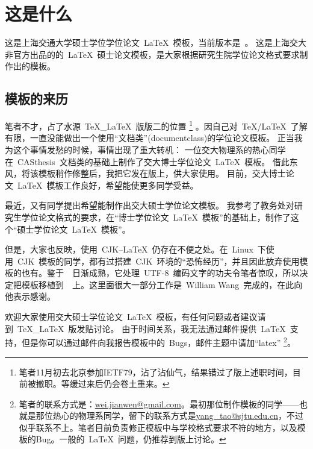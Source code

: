 
\chapter{这是什么}
\label{chap:what}

这是上海交通大学硕士学位学位论文~\LaTeX~模板，当前版本是~\version。
这是上海交大非官方出品的的~\LaTeX~硕士论文模板，是大家根据研究生院学位论文格式要求制作出的模板。

\section{模板的来历}

笔者不才，占了水源~TeX\_LaTeX~版版二的位置
\footnote{笔者11月初去北京参加IETF79，沾了沾仙气，结果错过了版上述职时间，目前被撤职。等缓过来后仍会卷土重来。}
。因自己对~\TeX/\LaTeX~了解有限，一直没能做出一个使用“文档类”(documentclass)的学位论文模板。
正当我为这个事情发愁的时候，事情出现了重大转机：
一位交大物理系的热心同学在~CASthesis~文档类的基础上制作了交大博士学位论文~\LaTeX~模板。
借此东风，将该模板稍作修整后，我把它发在版上，供大家使用。
目前，交大博士论文~\LaTeX~模板工作良好，希望能使更多同学受益。

最近，又有同学提出希望能制作出交大硕士学位论文模板。
我参考了教务处对研究生学位论文格式的要求，在``博士学位论文~\LaTeX~模板''的基础上，制作了这个``硕士学位论文~\LaTeX~模板''。

但是，大家也反映，使用~CJK--\LaTeX~仍存在不便之处。在~Linux~下使用~CJK~模板的同学，都有过搭建~CJK~环境的``恐怖经历''，并且因此放弃使用模板的也有。鉴于~\XeTeX~日渐成熟，它处理~UTF-8~编码文字的功夫令笔者惊叹，所以决定把模板移植到~\XeTeX~上。这里面很大一部分工作是~William Wang~完成的，在此向他表示感谢。

欢迎大家使用交大硕士学位论文~\LaTeX~模板，有任何问题或者建议请到~TeX\_LaTeX~版发贴讨论。
由于时间关系，我无法通过邮件提供~\LaTeX~支持，但是你可以通过邮件向我报告模板中的~Bugs，邮件主题中请加``latex''
\footnote{笔者的联系方式是：\href{mailto:wei.jianwen@gmail.com}{wei.jianwen@gmail.com}。最初那位制作模板的同学——也就是那位热心的物理系同学，留下的联系方式是\href{mailto:yang_tao@sjtu.edu.cn}{yang\_tao@sjtu.edu.cn}，不过似乎联系不上。笔者目前负责修正模板中与学校格式要求不符的地方，以及模板的Bug。一般的~\LaTeX~问题，仍推荐到版上讨论。}。

